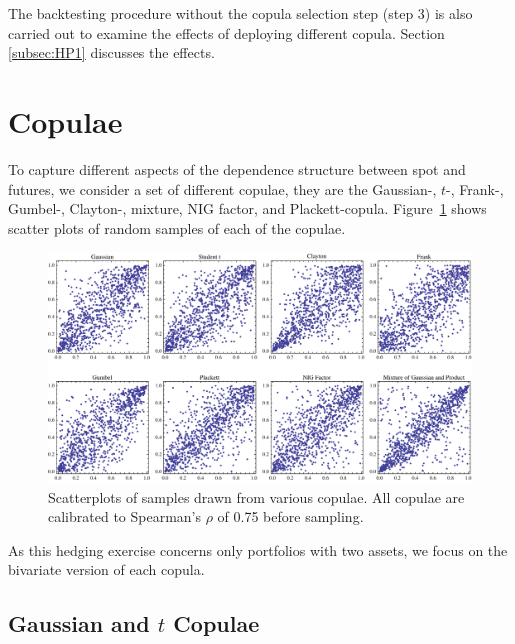 The backtesting procedure without the copula selection step (step 3) is also carried out to examine the effects of deploying different copula. 
Section \ref{subsec:HP1} discusses the effects. 

\section{Copulae}\label{sec:crm}
To capture different aspects of the dependence structure between spot and futures, we consider
a set of different copulae, 
they are the Gaussian-, $t$-, Frank-,
Gumbel-, Clayton-, mixture, NIG factor, and Plackett-copula. 
Figure~\ref{fig:copulaeScatterPlot} shows scatter plots of random
samples of each of the copulae. 
\begin{figure}[t]
    \centering
  \includegraphics[width=\textwidth]{_pics/copulas_scatterplots.pdf}
  \caption{Scatterplots of samples drawn from various copulae. All
    copulae are calibrated to Spearman's $\rho$ of 0.75 before
    sampling.}\label{fig:copulaeScatterPlot} 
\end{figure}

As this hedging exercise concerns only portfolios with two assets, we
focus on the bivariate version of each copula. 

\subsection{Gaussian and $t$ Copulae}\label{sec:ellpitical-copulae}

